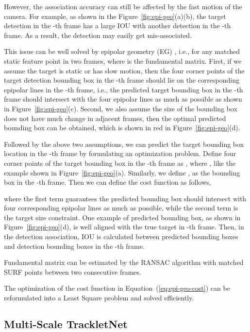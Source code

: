 \documentclass[10pt,twocolumn,letterpaper]{article}
\begin{document}
However, the association accuracy can still be affected by the fast motion of the camera. For example, as shown in the Figure~\ref{fig:epi-geo}(a)(b), the target detection in the -th frame has a large IOU with another detection in the -th frame. As a result, the detection may easily get mis-associated.

This issue can be well solved by epipolar geometry (EG) \cite{hartley2003multiple}, i.e.,  for any matched static feature point  in two frames, where  is the fundamental matrix.
First, if we assume the target is static or has slow motion, then the four corner points  of the target detection bounding box in the -th frame should lie on the corresponding epipolar lines in the -th frame, i.e., the predicted target bounding box in the -th frame should intersect with the four epipolar lines as much as possible as shown in Figure~\ref{fig:epi-geo}(c). Second, we also assume the size of the bounding box does not have much change in adjacent frames, then the optimal predicted bounding box can be obtained, which is shown in red in Figure~\ref{fig:epi-geo}(d). 

Followed by the above two assumptions, we can predict the target bounding box location in the -th frame by formulating an optimization problem. 
Define four corner points of the target bounding box in the -th frame as , where , like the example shown in Figure~\ref{fig:epi-geo}(a). 
Similarly, we define , as the bounding box in the -th frame. 
Then we can define the cost function as follows,

where the first term guarantees the predicted bounding box should intersect with four corresponding epipolar lines as much as possible, while the second term is the target size constraint. One example of predicted bounding box, as shown in Figure~\ref{fig:epi-geo}(d), is well aligned with the true target in -th frame. Then, in the detection association, IOU is calculated between predicted bounding boxes 
and detection bounding boxes in the -th frame.



Fundamental matrix  can be estimated by the RANSAC \cite{fischler1981random} algorithm with matched SURF points \cite{bay2006surf} between two consecutive frames. 


The optimization of the cost function in Equation~(\ref{eq:epi-geo-cost}) can be reformulated into a Least Square problem and solved efficiently.





\subsection{Multi-Scale TrackletNet}
\label{sec:trackletnet}
\end{document}
